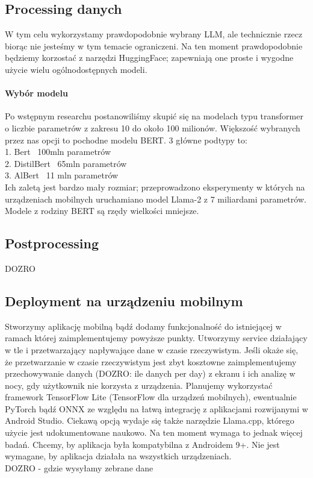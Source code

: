 \documentclass[12pt]{article}
\begin{document}
\subsection*{Processing danych}
W tym celu wykorzystamy prawdopodobnie wybrany LLM, ale technicznie rzecz biorąc nie jesteśmy w tym temacie ograniczeni. Na ten moment prawdopodobnie będziemy korzostać z narzędzi HuggingFace; zapewniają one proste i wygodne użycie wielu ogólnodostępnych modeli. \\
\paragraph{Wybór modelu}
Po wstępnym researchu postanowiliśmy skupić się na modelach typu transformer o liczbie parametrów z zakresu 10 do około 100 milionów. Większość wybranych przez nas opcji to pochodne modelu BERT\cite{devlin2019bertpretrainingdeepbidirectional}. 3 główne podtypy to: \\
1. Bert ~100mln parametrów \\
2. DistilBert ~65mln parametrów \\
3. AlBert ~11 mln parametrów \\
Ich zaletą jest bardzo mały rozmiar; przeprowadzono eksperymenty\cite{LLMmobile2024} w których na urządzeniach mobilnych uruchamiano model Llama-2 z 7 miliardami parametrów. Modele z rodziny BERT są rzędy wielkości mniejsze.
\subsection*{Postprocessing}
DOZRO \\
\subsection*{Deployment na urządzeniu mobilnym}
Stworzymy aplikację mobilną bądź dodamy funkcjonalność do istniejącej w ramach której zaimplementujemy powyższe punkty. Utworzymy service działający w tle i przetwarzający napływające dane w czasie rzeczywistym. Jeśli okaże się, że przetwarzanie w czasie rzeczywistym jest zbyt kosztowne zaimplementujemy przechowywanie danych (DOZRO: ile danych per day) z ekranu i ich analizę w nocy, gdy użytkownik nie korzysta z urządzenia. Planujemy wykorzystać framework TensorFlow Lite (TensorFlow dla urządzeń mobilnych), ewentualnie PyTorch bądź ONNX ze względu na łatwą integrację z aplikacjami rozwijanymi w Android Studio.
Ciekawą opcją wydaje się także narzędzie Llama.cpp, którego użycie jest udokumentowane naukowo\cite{LLMmobile2024}. Na ten moment wymaga to jednak więcej badań. Chcemy, by aplikacja była kompatybilna z Androidem 9+. Nie jest wymagane, by aplikacja działała na wszystkich urządzeniach.\\
DOZRO - gdzie wysyłamy zebrane dane
\end{document}
